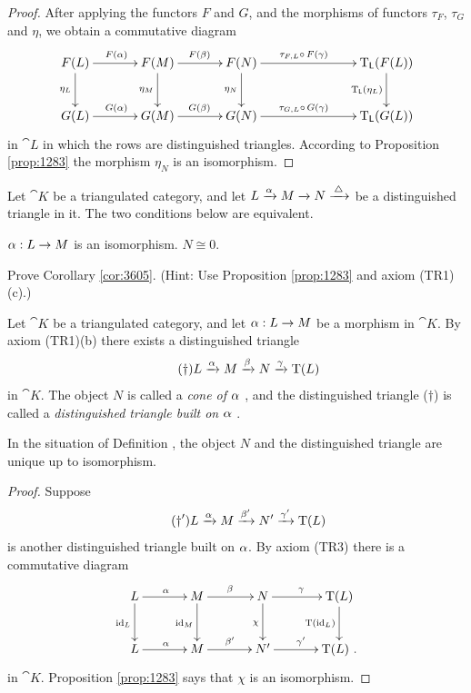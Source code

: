 \begin{proof}
After applying the functors $F$ and $G$, and the morphisms of functors 
$\tau_{F}$, $\tau_{G}$ and $\eta$, we obtain a 
commutative diagram 
\[  \UseTips  \xymatrix @C=8ex @R=6ex { 
F(L) 
\ar[r]^{F(\al)}
\ar[d]_{\eta_L}
&
F(M)
\ar[r]^{F(\be)}
\ar[d]_{\eta_M}
& 
F(N)
\ar[rr]^(0.43){\tau_{F, L} \circ \, F(\ga)}
\ar[d]_{\eta_N}
&
&
\opn{T}_{\cat{L}}(F(L))
\ar[d]_{\opn{T}_{\cat{L}}(\eta_L)}
\\
G(L) 
\ar[r]^{G(\al)}
&
G(M)
\ar[r]^{G(\be)}
& 
G(N)
\ar[rr]^(0.43){\tau_{G, L} \circ \, G(\ga)}
&
&
\opn{T}_{\cat{L}}(G(L)) 
} \]
in $\cat{L}$ in which the rows are distinguished triangles. 
According to Proposition \ref{prop:1283} the morphism $\eta_N$ is an 
isomorphism.
\end{proof}

\begin{cor} \label{cor:3605}   
Let $\cat{K}$ be a triangulated category, and let
$L \xrightarrow{\alpha} M \xrightarrow{} N \xrightarrow{\, \triangle\, }$
be a distinguished triangle in it.
The two conditions below are equivalent.  
\begin{enumerate}
 $\alpha : L \to M$ is an isomorphism.
 $N \cong 0$. 
\end{enumerate}
\end{cor}

\begin{exer} \label{exer:3600}
Prove Corollary \ref{cor:3605}. (Hint: Use Proposition \ref{prop:1283} and 
axiom (TR1)(c).)
\end{exer}

\begin{dfn} \label{dfn:3600}
Let $\cat{K}$ be a triangulated category, and let 
$\alpha : L \to M$ be a morphism in $\cat{K}$. By axiom (TR1)(b) there exists a 
distinguished triangle 
\[ \tag{$\dag$} L \xrightarrow{\alpha} M \xrightarrow{\beta} N \xrightarrow{\gamma} \operatorname{T}(L) \]
in $\cat{K}$. The object $N$ is called a 
{\em cone of $\alpha$}%
,
and the distinguished triangle ($\dag$) is called a 
{\em distinguished triangle built on $\alpha$}%
. 
\end{dfn}

\begin{cor} \label{cor:3600}
In the situation of Definition \tup{\ref{dfn:3600}}, the object $N$ and the 
distinguished triangle \tup{($\dag$)} are unique up to isomorphism.
\end{cor}

\begin{proof}
Suppose 
\[ \tag{$\dag'$} L \xrightarrow{\alpha} M \xrightarrow{\beta'} N' \xrightarrow{\gamma'} \operatorname{T}(L) \]
is another distinguished triangle built on $\alpha$. By axiom (TR3) there is a 
commutative diagram 
\[ \UseTips  \xymatrix @C=8ex @R=6ex { 
L 
\ar[r]^{\al}
\ar[d]_{\opn{id}_L}
&
M
\ar[r]^{\be}
\ar[d]_{\opn{id}_M}
& 
N
\ar[r]^{\ga}
\ar[d]_{\chi}
&
\opn{T}(L)
\ar[d]_{\opn{T}(\opn{id}_L)}
\\
L 
\ar[r]^{\al}
&
M
\ar[r]^{\be'}
& 
N'
\ar[r]^{\ga'}
&
\opn{T}(L) \ .
}  \]
in $\cat{K}$. Proposition \ref{prop:1283} says that $\chi$ is an isomorphism. 
\end{proof}

